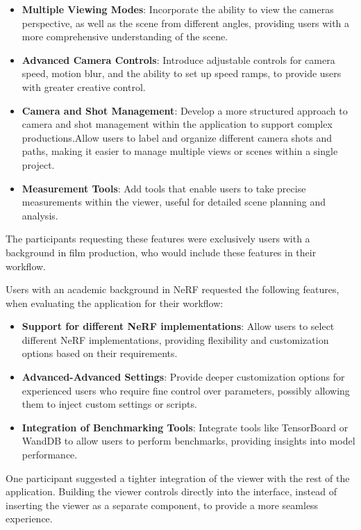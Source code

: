 \begin{itemize}
  \item \textbf{Multiple Viewing Modes}: Incorporate the ability to view the cameras perspective, as well as the scene from different angles, providing users with a more comprehensive understanding of the scene. 
  \cite{P5}
  \item \textbf{Advanced Camera Controls}: Introduce adjustable controls for camera speed, motion blur, and the ability to set up speed ramps, to provide users with greater creative control. 
  \cite{P5}
  \item \textbf{Camera and Shot Management}: Develop a more structured approach to camera and shot management within the application to support complex productions.Allow users to label and organize different camera shots and paths, making it easier to manage multiple views or scenes within a single project.
  \cite{P5}
  \item \textbf{Measurement Tools}: Add tools that enable users to take precise measurements within the viewer, useful for detailed scene planning and analysis. 
  \cite{P7}
\end{itemize}

The participants requesting these features were exclusively users with a background in film production, who would include these features in their workflow.

Users with an academic background in NeRF requested the following features, when evaluating the application for their workflow:

\begin{itemize}
  \item \textbf{Support for different NeRF implementations}: Allow users to select different NeRF implementations, providing flexibility and customization options based on their requirements. 
  \cite{P1}
  \item \textbf{Advanced-Advanced Settings}: Provide deeper customization options for experienced users who require fine control over parameters, possibly allowing them to inject custom settings or scripts.
  \cite{P9}
  \item \textbf{Integration of Benchmarking Tools}: Integrate tools like TensorBoard or WandDB to allow users to perform benchmarks, providing insights into model performance.
  \cite{P10}
\end{itemize}



One participant suggested a tighter integration of the viewer with the rest of the application.
Building the viewer controls directly into the interface, instead of inserting the viewer as a separate component, to provide a more seamless experience.
\cite{P9}


